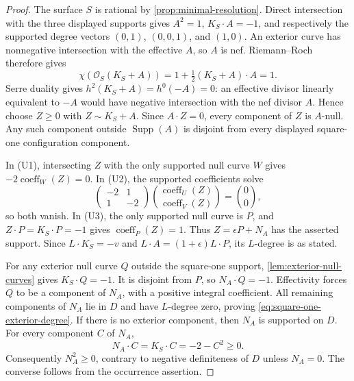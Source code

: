 \documentclass[11pt,reqno]{amsart}
\theoremstyle{definition}
\theoremstyle{remark}
\numberwithin{equation}{section}
\begin{document}
\begin{proof}
The surface $S$ is rational by \cref{prop:minimal-resolution}.
Direct intersection with the three displayed supports gives
$A^2=1$, $K_S\cdot A=-1$, and respectively the supported degree
vectors $(0,1)$, $(0,0,1)$, and $(1,0)$. An exterior curve has
nonnegative intersection with the effective $A$, so $A$ is nef.
Riemann--Roch therefore gives
\[
 \chi(\mathcal O_S(K_S+A))
 =1+\tfrac12(K_S+A)\cdot A=1.
\]
Serre duality gives $h^2(K_S+A)=h^0(-A)=0$: an effective divisor
linearly equivalent to $-A$ would have negative intersection with
the nef divisor $A$.  Hence choose $Z\ge0$ with $Z\sim K_S+A$.
Since $A\cdot Z=0$, every component of $Z$ is $A$-null.
Any such component outside $\operatorname{Supp}(A)$ is disjoint
from every displayed square-one configuration component.

In \textup{(U1)}, intersecting $Z$ with the only supported null
curve $W$ gives $-2\operatorname{coeff}_W(Z)=0$.
In \textup{(U2)}, the supported coefficients solve
\[
 \begin{pmatrix}-2&1\\1&-2\end{pmatrix}
 \binom{\operatorname{coeff}_U(Z)}
       {\operatorname{coeff}_V(Z)}=\binom00,
\]
so both vanish.  In \textup{(U3)}, the only supported null curve is
$P$, and $Z\cdot P=K_S\cdot P=-1$ gives
$\operatorname{coeff}_P(Z)=1$.  Thus $Z=\epsilon P+N_A$ has the
asserted support.  Since $L\cdot K_S=-v$ and
$L\cdot A=(1+\epsilon)L\cdot P$, its $L$-degree is as stated.

For any exterior null curve $Q$ outside the square-one support,
\cref{lem:exterior-null-curves} gives $K_S\cdot Q=-1$.
It is disjoint from $P$, so $N_A\cdot Q=-1$.  Effectivity forces
$Q$ to be a component of $N_A$, with a positive integral coefficient.
All remaining components of $N_A$ lie in $D$ and have $L$-degree
zero, proving \eqref{eq:square-one-exterior-degree}.
If there is no exterior component, then $N_A$ is supported on $D$.
For every component $C$ of $N_A$,
\[
 N_A\cdot C=K_S\cdot C=-2-C^2\ge0.
\]
Consequently $N_A^2\ge0$, contrary to negative definiteness of $D$
unless $N_A=0$.  The converse follows from the occurrence assertion.
\end{proof}
\end{document}
